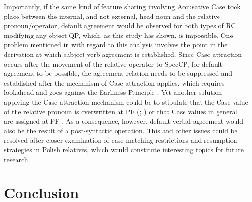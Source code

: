 \documentclass[output=paper]{langsci/langscibook}
\begin{document}
Importantly, if the same kind of feature sharing involving Accusative Case took place between the internal, and not external, head noun and the relative pronoun/operator, default agreement would be observed for both types of RC modifying any object QP, which, as this study has shown, is impossible. One problem mentioned in \citet{Łęska2016} with regard to this analysis involves the point in the derivation at which subject-verb agreement is established. Since Case attraction occurs after the movement of the relative operator to SpecCP, for default agreement to be possible, the agreement relation needs to be suppressed and established after the mechanism of Case attraction applies, which requires lookahead and goes against the Earliness Principle \citep{Pesetsky1989}. Yet another solution applying the Case attraction mechanism could be to stipulate that the Case value of the relative pronoun is overwritten at PF (\citealt[68–69]{Bianchi2000}; \citealt{Spyropoulos2011}) or that Case values in general are assigned at PF \citep{Alexiadou2007Syntactic,Assmann2014Matching}. As a consequence, however, default verbal agreement would also be the result of a post-syntactic operation. This and other issues could be resolved after closer examination of case matching restrictions and resumption strategies in Polish relatives, which would constitute interesting topics for future research.

\section{Conclusion}%
\end{document}
